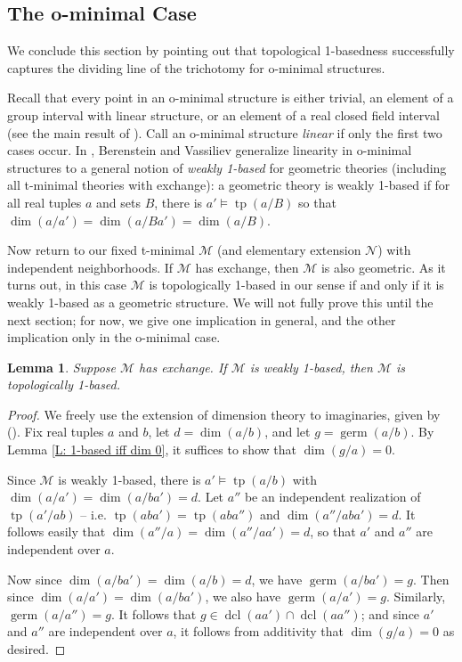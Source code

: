 \documentclass{amsart}
\newtheorem{lemma}[theorem]{Lemma}
\theoremstyle{definition}
\newcommand{\dcl}{\operatorname{dcl}}
\newcommand{\tp}{\operatorname{tp}}
\begin{document}
\subsection{The o-minimal Case}

We conclude this section by pointing out that topological 1-basedness successfully captures the dividing line of the trichotomy for o-minimal structures.

Recall that every point in an o-minimal structure is either trivial, an element of a group interval with linear structure, or an element of a real closed field interval (see the main result of \cite{PeStTricho}). Call an o-minimal structure \textit{linear} if only the first two cases occur. In \cite{BerVas}, Berenstein and Vassiliev generalize linearity in o-minimal structures to a general notion of \textit{weakly 1-based} for geometric theories (including all t-minimal theories with exchange): a geometric theory is weakly 1-based if for all real tuples $a$ and sets $B$, there is $a'\models\tp(a/B)$ so that $\dim(a/a')=\dim(a/Ba')=\dim(a/B)$.

Now return to our fixed t-minimal $\mathcal M$ (and elementary extension $\mathcal N$) with independent neighborhoods. If $\mathcal M$ has exchange, then $\mathcal M$ is also geometric. As it turns out, in this case $\mathcal M$ is topologically 1-based in our sense if and only if it is weakly 1-based as a geometric structure. We will not fully prove this until the next section; for now, we give one implication in general, and the other implication only in the o-minimal case.

\begin{lemma}\label{L: w1b to 1b}
    Suppose $\mathcal M$ has exchange. If $\mathcal M$ is weakly 1-based, then $\mathcal M$ is topologically 1-based.
\end{lemma}
\begin{proof}
    We freely use the extension of dimension theory to imaginaries, given by (\cite{Gagelman}). Fix real tuples $a$ and $b$, let $d=\dim(a/b)$, and let $g=\operatorname{germ}(a/b)$. By Lemma \ref{L: 1-based iff dim 0}, it suffices to show that $\dim(g/a)=0$.
    
    Since $\mathcal M$ is weakly 1-based, there is $a'\models\tp(a/b)$ with $\dim(a/a')=\dim(a/ba')=d$. Let $a''$ be an independent realization of $\tp(a'/ab)$ -- i.e. $\tp(aba')=\tp(aba'')$ and $\dim(a''/aba')=d$. It follows easily that $\dim(a''/a)=\dim(a''/aa')=d$, so that $a'$ and $a''$ are independent over $a$. 

    Now since $\dim(a/ba')=\dim(a/b)=d$, we have $\operatorname{germ}(a/ba')=g$. Then since $\dim(a/a')=\dim(a/ba')$, we also have $\operatorname{germ}(a/a')=g$. Similarly, $\operatorname{germ}(a/a'')=g$. It follows that $g\in\dcl(aa')\cap\dcl(aa'')$; and since $a'$ and $a''$ are independent over $a$, it follows from additivity that $\dim(g/a)=0$ as desired. 
\end{proof}
\end{document}
